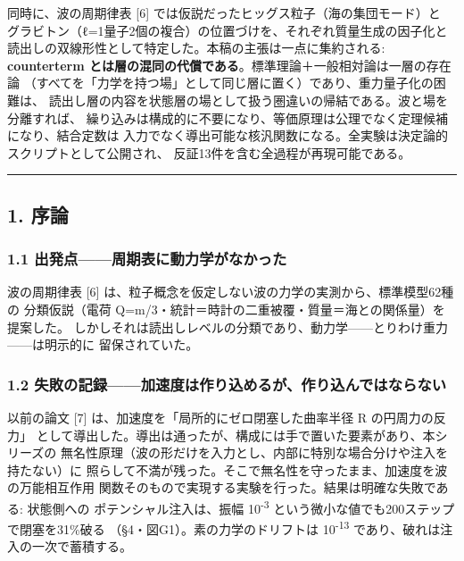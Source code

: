 \documentclass[
]{ltjarticle}
\begin{document}
同時に、波の周期律表 {[}6{]}
では仮説だったヒッグス粒子（海の集団モード）と
グラビトン（ℓ=1量子2個の複合）の位置づけを、それぞれ質量生成の因子化と
読出しの双線形性として特定した。本稿の主張は一点に集約される:
\textbf{counterterm
とは層の混同の代償である}。標準理論＋一般相対論は一層の存在論
（すべてを「力学を持つ場」として同じ層に置く）であり、重力量子化の困難は、
読出し層の内容を状態層の場として扱う圏違いの帰結である。波と場を分離すれば、
繰り込みは構成的に不要になり、等価原理は公理でなく定理候補になり、結合定数は
入力でなく導出可能な核汎関数になる。全実験は決定論的スクリプトとして公開され、
反証13件を含む全過程が再現可能である。

\begin{center}\rule{0.5\linewidth}{0.5pt}\end{center}

\subsection{1. 序論}\label{ux5e8fux8ad6}

\subsubsection{1.1
出発点------周期表に動力学がなかった}\label{ux51faux767aux70b9ux5468ux671fux8868ux306bux52d5ux529bux5b66ux304cux306aux304bux3063ux305f}

波の周期律表 {[}6{]}
は、粒子概念を仮定しない波の力学の実測から、標準模型62種の
分類仮説（電荷
Q=m/3・統計＝時計の二重被覆・質量＝海との関係量）を提案した。
しかしそれは読出しレベルの分類であり、動力学------とりわけ重力------は明示的に
留保されていた。

\subsubsection{1.2
失敗の記録------加速度は作り込めるが、作り込んではならない}\label{ux5931ux6557ux306eux8a18ux9332ux52a0ux901fux5ea6ux306fux4f5cux308aux8fbcux3081ux308bux304cux4f5cux308aux8fbcux3093ux3067ux306fux306aux3089ux306aux3044}

以前の論文 {[}7{]} は、加速度を「局所的にゼロ閉塞した曲率半径 R
の円周力の反力」
として導出した。導出は通ったが、構成には手で置いた要素があり、本シリーズの
無名性原理（波の形だけを入力とし、内部に特別な場合分けや注入を持たない）に
照らして不満が残った。そこで無名性を守ったまま、加速度を波の万能相互作用
関数そのもので実現する実験を行った。結果は明確な失敗である: 状態側への
ポテンシャル注入は、振幅 10\textsuperscript{-3}
という微小な値でも200ステップで閉塞を31\%破る
（§4・図G1）。素の力学のドリフトは 10\textsuperscript{-13}
であり、破れは注入の一次で蓄積する。
\end{document}
